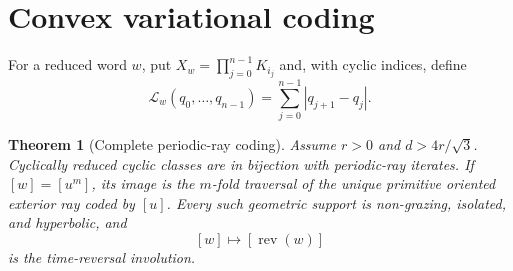 \documentclass[10pt]{article}
\newtheorem{theorem}{Theorem}
\newcommand{\rev}{\operatorname{rev}}
\begin{document}
\section{Convex variational coding}
For a reduced word $w$, put $X_w=\prod_{j=0}^{n-1}K_{i_j}$ and, with cyclic
indices, define
\begin{equation}\label{eq:length}
 \mathcal L_w(q_0,\ldots,q_{n-1})
   =\sum_{j=0}^{n-1}|q_{j+1}-q_j|.
\end{equation}

\begin{theorem}[Complete periodic-ray coding]\label{thm:coding}
Assume $r>0$ and $d>4r/\sqrt3$.  Cyclically reduced cyclic classes are in
bijection with periodic-ray iterates.  If $[w]=[u^m]$, its image is the
$m$-fold traversal of the unique primitive oriented exterior ray coded by
$[u]$.  Every such geometric support is non-grazing, isolated, and
hyperbolic, and
\[
 [w]\longmapsto[\rev(w)]
\]
is the time-reversal involution.
\end{theorem}
\end{document}

